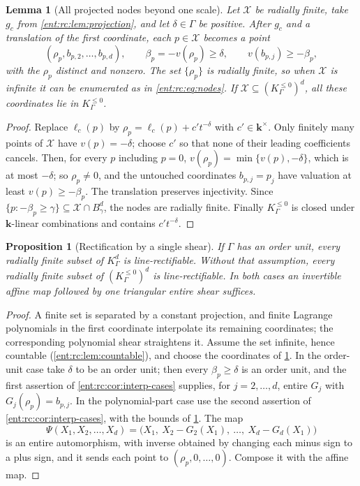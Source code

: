\documentclass[11pt]{article}
\theoremstyle{plain}
\newtheorem{lemma}[lemma]{Lemma}
\theoremstyle{plain}
\newtheorem{proposition}[proposition]{Proposition}
\theoremstyle{plain}
\theoremstyle{definition}
\theoremstyle{definition}
\theoremstyle{definition}
\theoremstyle{definition}
\theoremstyle{remark}
\newcommand{\K}{K_\Gamma}\newcommand{\KD}{K_\Delta}
\newcommand{\kk}{\mathbf k}\newcommand{\PP}{\mathbb P}
\newcommand{\Kle}{K_\Gamma^{\le0}}\DeclareMathOperator{\Jac}{Jac}
\begin{document}
\begin{lemma}[All projected nodes beyond one scale]\label{ent:rc:lem:shift}
Let $\mathcal X$ be radially finite, take $g_c$ from
\cref{ent:rc:lem:projection}, and let $\delta\in\Gamma$ be positive. After
$g_c$ and a translation of the first coordinate, each $p\in\mathcal X$ becomes
a point
\[
 (\rho_p,b_{p,2},\ldots,b_{p,d}),\qquad
 \beta_p=-v(\rho_p)\ge\delta,\qquad v(b_{p,j})\ge-\beta_p ,
\]
with the $\rho_p$ distinct and nonzero. The set $\{\rho_p\}$ is radially
finite, so when $\mathcal X$ is infinite it can be enumerated as in
\eqref{ent:rc:eq:nodes}. If $\mathcal X\subseteq(\Kle)^d$, all these
coordinates lie in $\Kle$.
\end{lemma}
\begin{proof}
Replace $\ell_c(p)$ by $\rho_p=\ell_c(p)+c't^{-\delta}$ with $c'\in\kk^\times$.
Only finitely many points of $\mathcal X$ have $v(p)=-\delta$; choose $c'$ so
that none of their leading coefficients cancels. Then, for every $p$ including
$p=0$, $v(\rho_p)=\min\{v(p),-\delta\}$, which is at most $-\delta$; so
$\rho_p\ne0$, and the untouched coordinates $b_{p,j}=p_j$ have valuation at
least $v(p)\ge-\beta_p$. The translation preserves injectivity. Since
$\{p:-\beta_p\ge\gamma\}\subseteq\mathcal X\cap B^d_\gamma$, the nodes are
radially finite. Finally $\Kle$ is closed under $\kk$-linear combinations and
contains $c't^{-\delta}$.
\end{proof}

\begin{proposition}[Rectification by a single shear]\label{ent:rc:prop:positive}
If $\Gamma$ has an order unit, every radially finite subset of $\K^d$ is
line-rectifiable. Without that assumption, every radially finite subset of
$(\Kle)^d$ is line-rectifiable. In both cases an invertible affine map
followed by one triangular entire shear suffices.
\end{proposition}
\begin{proof}
A finite set is separated by a constant projection, and finite Lagrange
polynomials in the first coordinate interpolate its remaining coordinates; the
corresponding polynomial shear straightens it. Assume the set infinite, hence
countable (\cref{ent:rc:lem:countable}), and choose the coordinates of
\cref{ent:rc:lem:shift}. In the order-unit case take $\delta$ to be an order
unit; then every $\beta_p\ge\delta$ is an order unit, and the first assertion
of \cref{ent:rc:cor:interp-cases} supplies, for $j=2,\ldots,d$, entire $G_j$
with $G_j(\rho_p)=b_{p,j}$. In the polynomial-part case use the second
assertion of \cref{ent:rc:cor:interp-cases}, with the bounds of
\cref{ent:rc:lem:shift}. The map
\begin{equation}\label{ent:rc:eq:shear}
 \Psi(X_1,X_2,\ldots,X_d)=\bigl(X_1,\ X_2-G_2(X_1),\ \ldots,\
 X_d-G_d(X_1)\bigr)
\end{equation}
is an entire automorphism, with inverse obtained by changing each minus sign
to a plus sign, and it sends each point to $(\rho_p,0,\ldots,0)$. Compose it
with the affine map.
\end{proof}
\end{document}
